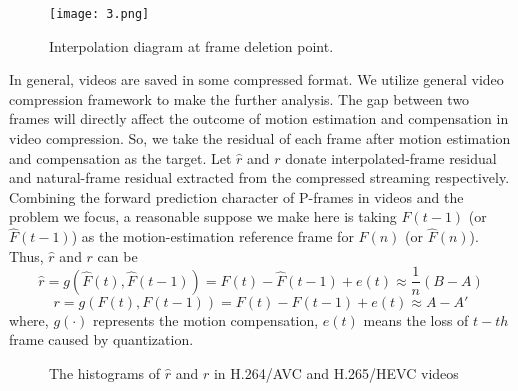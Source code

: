 \documentclass[pdftex,twocolumn,epjc3]{svjour3}          %
\begin{document}
\begin{figure}[!t]
 \texttt{[image: 3.png]}
 \caption{Interpolation diagram at frame deletion point.}\label{fig:3}
\end{figure}
In general, videos are saved in some compressed format. We utilize general video compression framework to make the further analysis. The gap between two frames will directly affect the outcome of motion estimation and compensation in video compression. So, we take the residual of each frame after motion estimation and compensation as the target. Let $\hat{r}$ and $r$ donate interpolated-frame residual and natural-frame residual extracted from the compressed streaming respectively. Combining the forward prediction character of P-frames in videos and the problem we focus, a reasonable suppose we make here is taking $F(t-1)$ (or $\hat{F}(t-1)$) as the motion-estimation reference frame for $F(n)$ (or $\hat{F}(n)$). Thus, $\hat{r}$ and $r$ can be
\begin{equation}
\hat{r}=g(\hat{F}(t),\hat{F}(t-1))=\hat{F}(t)-\hat{F}(t-1)+e(t)\approx\frac{1}{n}(B-A)
\end{equation}
\begin{equation}
r=g(F(t),F(t-1))=F(t)-F(t-1)+e(t)\approx A-A'
\end{equation}
where, $g(\cdot)$ represents the motion compensation, $e(t)$ means the loss of $t-th$ frame caused by quantization.
\begin{figure*}[t!]
\begin{minipage}[t]{0.5\linewidth}
\centering
{}
\end{minipage}
\begin{minipage}[t]{0.5\linewidth}
\centering
{}
\end{minipage}
\begin{minipage}[t]{0.5\linewidth}
\centering
{}
\end{minipage}
\begin{minipage}[t]{0.5\linewidth}
\centering
{}
\end{minipage}
\caption{The histograms of $\hat{r}$ and $r$ in H.264/AVC and H.265/HEVC videos}
\label{fig:4}
\end{figure*}
\end{document}
